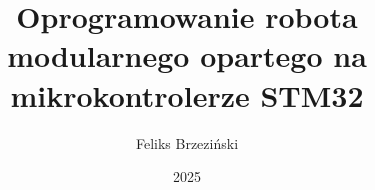 \documentclass[thesis=inz,faculty=ee]{EE-dyplom}
\title{Oprogramowanie robota modularnego opartego na mikrokontrolerze STM32}
\author{Feliks Brzeziński}
\date{2025}
\begin{document}
    
    \frontpages

    

    \bibliografia

    
    \listoffigures
    \listoftables
\end{document}
